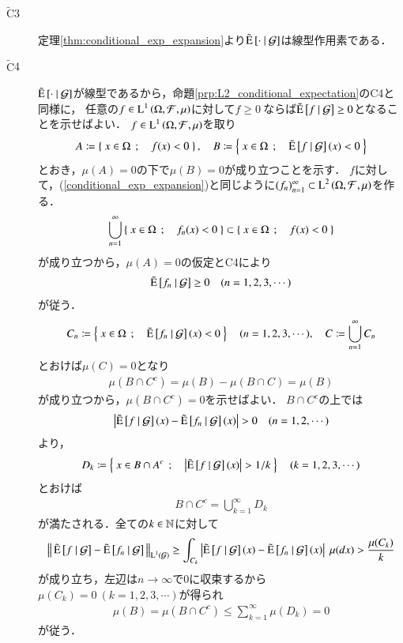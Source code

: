 \begin{prf}
\begin{description}
			\item[$\tilde{\mathrm{C}}$3]	
				定理\ref{thm:conditional_exp_expansion}より$\tilde{\operatorname{E}} \left[ \cdot \ \middle|\ \mathcal{G} \right]$は線型作用素である．

			\item[$\tilde{\mathrm{C}}$4]	
				$\tilde{\operatorname{E}} \left[ \cdot \ \middle|\ \mathcal{G} \right]$が線型であるから，命題\ref{prp:L2_conditional_expectation}のC4と同様に，
				任意の$f \in \operatorname{L}^{1} \left(\Omega, \mathcal{F},\mu\right)$に対して$f \geq 0\ $ならば$\tilde{\operatorname{E}} \left[ f \ \middle|\ \mathcal{G} \right] \geq 0$となることを示せばよい．
				$f \in \operatorname{L}^{1} \left(\Omega, \mathcal{F},\mu\right)$を取り
				\begin{align}
					A \coloneqq \left\{\ x \in \Omega\ \, ; \quad f(x) < 0\ \right\},\quad
					B \coloneqq \left\{\ x \in \Omega\ \, ; \quad \tilde{\operatorname{E}} \left[ f \ \middle|\ \mathcal{G} \right](x) < 0\ \right\}
				\end{align}
				とおき，$\mu(A) = 0$の下で$\mu(B) = 0$が成り立つことを示す．
				$f$に対して，(\ref{conditional_exp_expansion})と同じように$(f_n)_{n=1}^{\infty} \subset \operatorname{L}^{2} \left(\Omega,\mathcal{F},\mu\right)$を作る．
				\begin{align}
					\bigcup_{n=1}^{\infty}\left\{\ x \in \Omega\ \, ; \quad f_n(x) < 0\ \right\} \subset \left\{\ x \in \Omega\ \, ; \quad f(x) < 0\ \right\}
				\end{align}
				が成り立つから，$\mu(A)=0$の仮定とC4により
				\begin{align}
					\tilde{\operatorname{E}} \left[ f_n \ \middle|\ \mathcal{G} \right] \geq 0 \quad (n = 1,2,3,\cdots)
				\end{align}
				が従う．
				\begin{align}
					C_n \coloneqq \left\{\ x \in \Omega\ \, ; \quad \tilde{\operatorname{E}} \left[ f_n \ \middle|\ \mathcal{G} \right](x) < 0\ \right\} \quad (n=1,2,3,\cdots), \quad
					C \coloneqq \bigcup_{n=1}^{\infty} C_n
				\end{align}
				とおけば$\mu(C) = 0$となり
				\begin{align}
					\mu(B \cap C^c) = \mu(B) - \mu(B \cap C) = \mu(B)
				\end{align}
				が成り立つから，$\mu(B \cap C^c) = 0$を示せばよい．
				$B \cap C^c$の上では
				\begin{align}
					\left| \tilde{\operatorname{E}} \left[ f \ \middle|\ \mathcal{G} \right](x) - \tilde{\operatorname{E}} \left[ f_n \ \middle|\ \mathcal{G} \right](x) \right| > 0
					\quad (n=1,2,\cdots)
				\end{align}
				より，
				\begin{align}
					D_k \coloneqq \left\{\ x \in B \cap A^c\ \, ; \quad \left| \tilde{\operatorname{E}} \left[ f \ \middle|\ \mathcal{G} \right](x)\right| > 1/k\ \right\} \quad (k = 1,2,3,\cdots)
				\end{align}
				とおけば
				\begin{align}
					B \cap C^c = \bigcup_{k=1}^{\infty} D_k
				\end{align}
				が満たされる．全ての$k \in \mathbb{N}$に対して
				\begin{align}
					\left\|\, \tilde{\operatorname{E}} \left[ f \ \middle|\ \mathcal{G} \right] - \tilde{\operatorname{E}} \left[ f_n \ \middle|\ \mathcal{G} \right]\, \right\|_{\operatorname{L}^{1} \left(\mathcal{G}\right)}
					\geq \int_{C_k} \left| \tilde{\operatorname{E}} \left[ f \ \middle|\ \mathcal{G} \right](x) - \tilde{\operatorname{E}} \left[ f_n \ \middle|\ \mathcal{G} \right](x) \right|\ \mu(dx)
					> \frac{\mu(C_k)}{k}
				\end{align}
				が成り立ち，左辺は$n \longrightarrow \infty$で0に収束するから
				$\mu(C_k) = 0 \ (k = 1,2,3,\cdots)$が得られ
				\begin{align}
					\mu(B) = \mu(B \cap C^c) \leq \sum_{k=1}^{\infty} \mu(D_k) = 0
				\end{align}
				が従う．
				

\end{description}
\end{prf}
